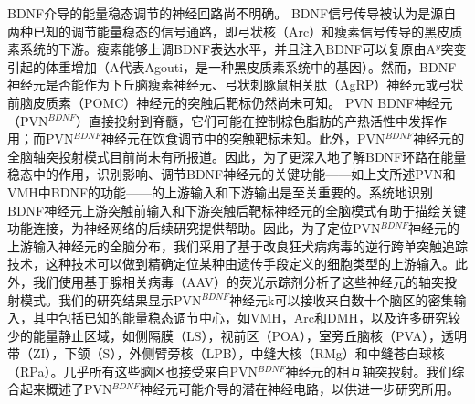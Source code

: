 BDNF介导的能量稳态调节的神经回路尚不明确。 BDNF信号传导被认为是源自两种已知的调节能量稳态的信号通路\citep{waterson2015neuronal, krashes2016melanocortin}，即弓状核（Arc）\citep{xu2003brain}和瘦素信号传导\citep{liao2012dendritically}的黑皮质素系统的下游。瘦素能够上调BDNF表达水平，并且注入BDNF可以复原由A$^{y}$突变引起的体重增加（A代表Agouti，是一种黑皮质素系统中的基因）。然而，BDNF神经元是否能作为下丘脑瘦素神经元、弓状刺豚鼠相关肽（AgRP）神经元或弓状前脑皮质素（POMC）神经元的突触后靶标仍然尚未可知。 PVN BDNF神经元（PVN$^{BDNF}$）直接投射到脊髓，它们可能在控制棕色脂肪的产热活性中发挥作用；而PVN$^{BDNF}$神经元在饮食调节中的突触靶标未知\citep{an2015discrete}。此外，PVN$^{BDNF}$神经元的全脑轴突投射模式目前尚未有所报道。因此，为了更深入地了解BDNF环路在能量稳态中的作用，识别影响、调节BDNF神经元的关键功能——如上文所述PVN和VMH中BDNF的功能——的上游输入和下游输出是至关重要的。系统地识别BDNF神经元上游突触前输入和下游突触后靶标神经元的全脑模式有助于描绘关键功能连接，为神经网络的后续研究提供帮助。因此，为了定位PVN$^{BDNF}$神经元的上游输入神经元的全脑分布，我们采用了基于改良狂犬病病毒的逆行跨单突触追踪技术，这种技术可以做到精确定位某种由遗传手段定义的细胞类型的上游输入\citep{wickersham2007monosynaptic}。此外，我们使用基于腺相关病毒（AAV）的荧光示踪剂分析了这些神经元的轴突投射模式。我们的研究结果显示PVN$^{BDNF}$神经元k可以接收来自数十个脑区的密集输入，其中包括已知的能量稳态调节中心，如VMH，Arc和DMH，以及许多研究较少的能量静止区域，如侧隔膜（LS），视前区（POA），室旁丘脑核（PVA），透明带（ZI），下颌（S），外侧臂旁核（LPB），中缝大核（RMg）和中缝苍白球核（RPa）。几乎所有这些脑区也接受来自PVN$^{BDNF}$神经元的相互轴突投射。我们综合起来概述了PVN$^{BDNF}$神经元可能介导的潜在神经电路，以供进一步研究所用。

